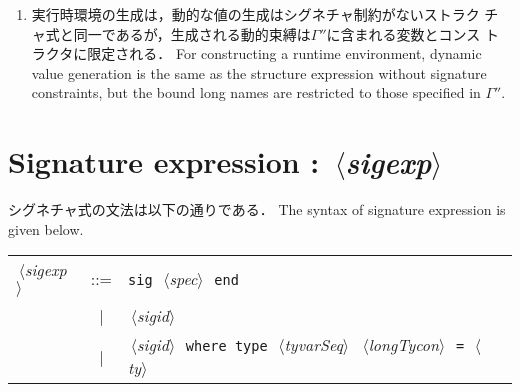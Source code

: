 \documentclass{jbook}
\newcommand{\txt}[2]{#2}
\newcommand{\vbar}{\mbox{\ $|$\ }}
\newcommand{\nonterm}[1]{\mbox{$\,\langle$}{\it #1}\mbox{$\rangle\,$}}
\newcommand{\term}[1]{\mbox{{\tt #1}}}
\newcommand{\ass}{\Gamma}
\begin{document}
\begin{itemize}
\begin{enumerate}
\item 
\ifjp%
	実行時環境の生成は，動的な値の生成はシグネチャ制約がないストラク
チャ式と同一であるが，生成される動的束縛は$\ass''$に含まれる変数とコンス
トラクタに限定される．
\else%
	For constructing a runtime environment, dynamic value generation
is the same as the structure expression without signature constraints,
but the bound long names are restricted to those specified in $\ass''$.
\fi%
\end{enumerate}
\end{itemize}

\section{
\txt{シグネチャ式}{Signature expression} : \nonterm{sigexp}
}
\label{section:reference:signature}

\ifjp%
	シグネチャ式の文法は以下の通りである．
\else%
	The syntax of signature expression is given below.
\fi%

\begin{center}
\begin{tabular}{lcll}
\nonterm{sigexp} &::=& \term{sig}\ \nonterm{spec}\ \term{end} \\
&\vbar& \nonterm{sigid} \\
&\vbar& \nonterm{sigid}\ \term{where type}\ \nonterm{tyvarSeq}\
	\nonterm{longTycon}\ \term{=}\ \nonterm{ty} \\
\end{tabular}
\end{center}
\end{document}

